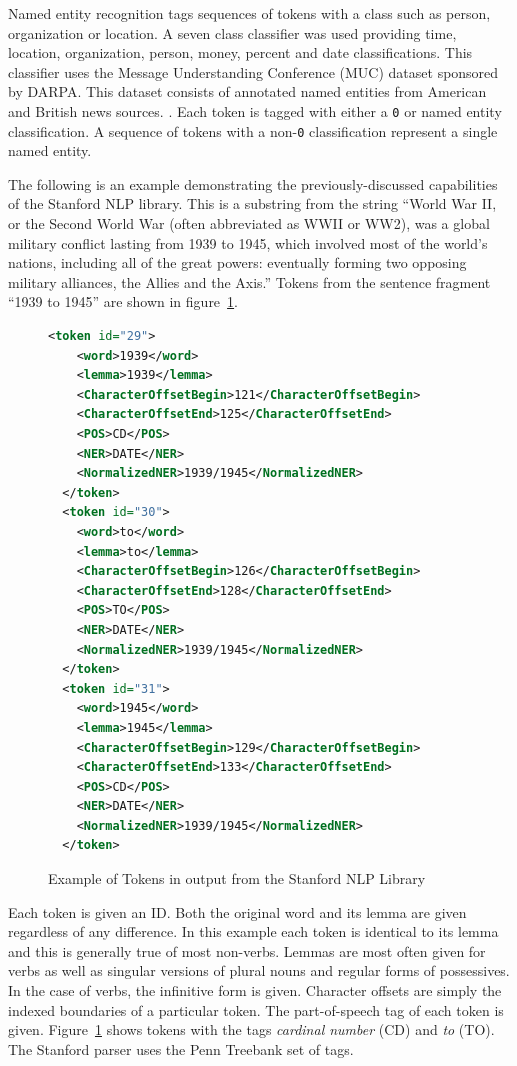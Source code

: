 Named entity recognition tags sequences of tokens with a class such as person, organization or location.  A seven class classifier was used providing time, location, organization, person, money, percent and date classifications.  This classifier uses the Message Understanding Conference (MUC) dataset sponsored by DARPA.  This dataset consists of annotated named entities from American and British news sources. \cite{muc}.  Each token is tagged with either a \verb|0| or named entity classification.  A sequence of tokens with a non-\verb|0| classification represent a single named entity.

The following is an example demonstrating the previously-discussed capabilities of the Stanford NLP library.  This is a substring from the string ``World War II, or the Second World War (often abbreviated as WWII or WW2), was a global military conflict lasting from 1939 to 1945, which involved most of the world's nations, including all of the great powers: eventually forming two opposing military alliances, the Allies and the Axis.''  Tokens from the sentence fragment ``1939 to 1945'' are shown in figure~\ref{fig:stanford-toks}. 

\begin{figure}
\begin{lstlisting}[language=xml,style=mystyle]
  <token id="29">
    <word>1939</word>
    <lemma>1939</lemma>
    <CharacterOffsetBegin>121</CharacterOffsetBegin>
    <CharacterOffsetEnd>125</CharacterOffsetEnd>
    <POS>CD</POS>
    <NER>DATE</NER>
    <NormalizedNER>1939/1945</NormalizedNER>
  </token>
  <token id="30">
    <word>to</word>
    <lemma>to</lemma>
    <CharacterOffsetBegin>126</CharacterOffsetBegin>
    <CharacterOffsetEnd>128</CharacterOffsetEnd>
    <POS>TO</POS>
    <NER>DATE</NER>
    <NormalizedNER>1939/1945</NormalizedNER>
  </token>
  <token id="31">
    <word>1945</word>
    <lemma>1945</lemma>
    <CharacterOffsetBegin>129</CharacterOffsetBegin>
    <CharacterOffsetEnd>133</CharacterOffsetEnd>
    <POS>CD</POS>
    <NER>DATE</NER>
    <NormalizedNER>1939/1945</NormalizedNER>
  </token>
\end{lstlisting}
\caption{Example of Tokens in output from the Stanford NLP Library}
\label{fig:stanford-toks}
\end{figure}

Each token is given an ID.  Both the original word and its lemma are given regardless of any difference.  In this example each token is identical to its lemma and this is generally true of most non-verbs.  Lemmas are most often given for verbs as well as singular versions of plural nouns and regular forms of possessives.  In the case of verbs, the infinitive form is given.  Character offsets are simply the indexed boundaries of a particular token.  The part-of-speech tag of each token is given.  Figure~\ref{fig:stanford-toks} shows tokens with the tags \emph{cardinal number} (CD) and \emph{to} (TO).  The Stanford parser uses the Penn Treebank set of tags.

